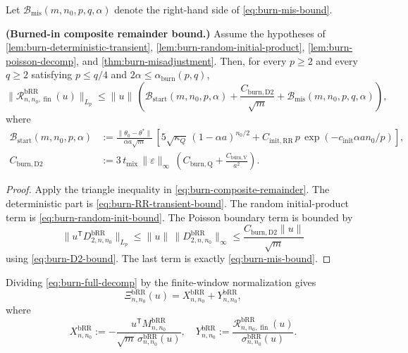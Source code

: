 Let $\mathcal{B}_{\mathrm{mis}}(m,n_{0},p,q,\alpha)$ denote the right-hand side of
\eqref{eq:burn-mis-bound}.

\begin{lemma}\label{lem:burn-R-bound}
  \textbf{(Burned-in composite remainder bound.)}
  Assume the hypotheses of \cref{lem:burn-deterministic-transient},
  \cref{lem:burn-random-initial-product}, \cref{lem:burn-poisson-decomp}, and
  \cref{thm:burn-misadjustment}. Then, for every $p \ge 2$ and every $q \ge 2$
  satisfying $p \le q / 4$ and $2 \alpha \le \alpha_{\mathrm{burn}}(p,q)$,
  \begin{equation}
\lVert \mathcal{R}_{n,n_{0}, \operatorname{fin}}^{\mathrm{bRR}}(u) \rVert_{L_{p}}
    \le \lVert u \rVert \, \left( \mathcal{B}_{\mathrm{start}}(m,n_{0},p,\alpha)
      + \frac{C_{\mathrm{burn,D2}}}{\sqrt{m}}
      + \mathcal{B}_{\mathrm{mis}}(m,n_{0},p,q,\alpha) \right),
\label{eq:burn-R-bound}
\end{equation}
  where
  \[
\begin{aligned}
\mathcal{B}_{\mathrm{start}}(m,n_{0},p,\alpha)
    &:= \frac{\lVert \theta_{0} - \theta^{*} \rVert}{\alpha a \sqrt{m}} \, \left[ 5 \sqrt{\kappa_{Q}} \, (1 - \alpha a)^{n_{0} / 2}
  + C_{\mathrm{init,RR}} \, p \, \exp\left(-c_{\mathrm{init}} \alpha a n_{0} / p\right) \right], \\
  C_{\mathrm{burn,D2}}
    &:= 3 \, t_{\mathrm{mix}} \, \lVert \varepsilon \rVert_{\infty}
        \, \left( C_{\mathrm{burn,Q}} + \frac{C_{\mathrm{burn,V}}}{a^{2}} \right).
\end{aligned}
\]
\end{lemma}

\begin{proof} Apply the triangle inequality in \eqref{eq:burn-composite-remainder}. The
deterministic part is \eqref{eq:burn-RR-transient-bound}. The random initial-product
term is \eqref{eq:burn-random-init-bound}. The Poisson boundary term is bounded by
\[
\lVert u^{\mathsf{T}} D_{2,n,n_{0}}^{\mathrm{bRR}} \rVert_{L_{p}}
  \le \lVert u \rVert \, \lVert D_{2,n,n_{0}}^{\mathrm{bRR}} \rVert_{\infty}
  \le \frac{C_{\mathrm{burn,D2}} \lVert u \rVert}{\sqrt{m}}
\]
using \eqref{eq:burn-D2-bound}. The last term is exactly \eqref{eq:burn-mis-bound}. \end{proof}

Dividing \eqref{eq:burn-full-decomp} by the finite-window normalization gives
\begin{equation}
\Xi_{n,n_{0}}^{\mathrm{bRR}}(u) = X_{n,n_{0}}^{\mathrm{bRR}} + Y_{n,n_{0}}^{\mathrm{bRR}},
\label{eq:burn-XY-split}
\end{equation}
where
\[
X_{n,n_{0}}^{\mathrm{bRR}}
  := -\frac{u^{\mathsf{T}} M_{n,n_{0}}^{\mathrm{bRR}}}{\sqrt{m} \, \sigma_{n,n_{0}}^{\mathrm{bRR}}(u)},
\quad
Y_{n,n_{0}}^{\mathrm{bRR}}
  := \frac{\mathcal{R}_{n,n_{0}, \operatorname{fin}}^{\mathrm{bRR}}(u)}{\sigma_{n,n_{0}}^{\mathrm{bRR}}(u)}.
\]

